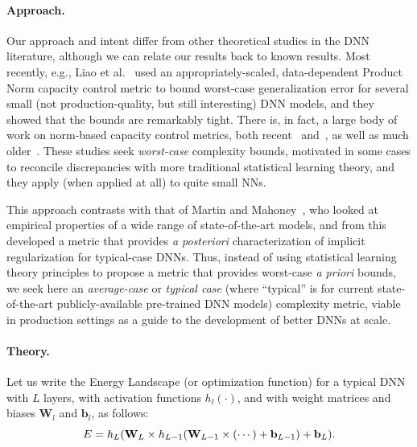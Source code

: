 \vspace{-2mm}
\paragraph{Approach.} 
Our approach and intent differ from other theoretical studies in the DNN literature, although we can relate our results back to known results.
Most recently, e.g., Liao et al.~\cite{LMBx18_TR} used an appropriately-scaled, data-dependent Product Norm capacity control metric to bound worst-case generalization error for several small (not production-quality, but still interesting) DNN models, and they showed that the bounds are remarkably tight.
There is, in fact, a large body of work on norm-based capacity control metrics, both recent~\cite{LMBx18_TR, SHNx17_TR,PLMx18_TR} and~\cite{NTS14_TR,NTS15,NBMS17_TR,BFT17_TR,YM17_TR,KKB17_TR,NBS17_TR,AGNZ18_TR,ACH18_TR,ZF18_TR}, as well as much older~\cite{Bar97,MN09_TR}. 
These studies seek \emph{worst-case} complexity bounds, motivated in some cases to reconcile discrepancies with more traditional statistical learning theory, and they apply (when applied at all) to quite small NNs.

This approach contrasts with that of Martin and Mahoney~\cite{MM18_TR,MM19_HTSR_ICML}, who looked at empirical properties of a wide range of state-of-the-art models, and from this developed a metric that provides \emph{a posteriori} characterization of implicit regularization for typical-case DNNs.  
Thus, instead of using statistical learning theory principles to propose a metric that provides worst-case \emph{a priori} bounds, we seek here an \emph{average-case} or \emph{typical case} (where ``typical'' is for current state-of-the-art publicly-available pre-trained DNN models) complexity metric, viable in production settings as a guide to the development of better DNNs at scale.

\vspace{-2mm}
\paragraph{Theory.} 
Let us write the Energy Landscape (or optimization function) for a typical DNN with $L$ layers, with activation functions $h_{l}(\cdot)$, and with weight matrices and 
biases $\mathbf{W}_{l}$ and $\mathbf{b}_{l}$, as follows: 
\vspace{-2mm}
\begin{equation}
E=h_{L}(\mathbf{W}_{L}\times h_{L-1}(\mathbf{W}_{L-1}\times(\cdots)+\mathbf{b}_{L-1})+\mathbf{b}_{L})  .
\label{eqn:dnn_energy}
\vspace{-1mm}
\end{equation}

